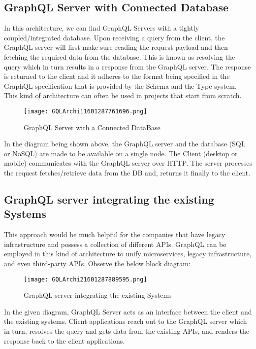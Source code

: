 \documentclass[../main.tex]{subfiles}
\begin{document}
\subsection{GraphQL Server with Connected Database}
In this architecture, we can find GraphQL Servers with a tightly coupled/integrated database.
Upon receiving a query from the client, the GraphQL server will first make sure reading the request payload and then fetching the required data from the database.
This is known as resolving the query which in turn results in a response from the GraphQL server.
The response is returned to the client and it adheres to the format being specified in the GraphQL specification that is provided by the Schema and the Type system.
This kind of architecture can often be used in projects that start from scratch.

\begin{figure}[h!]
\centerline{\texttt{[image: GQLArchi11601287761696.png]}}
\caption{GraphQL Server with a Connected DataBase}
\label{fig:GraphQL-Server-with-a-Connected-DataBase}
\end{figure}

In the diagram being shown above, the GraphQL server and the database (SQL or NoSQL) are made to be available on a single node. The Client (desktop or mobile) communicates with the GraphQL server over HTTP. The server processes the request fetches/retrieve data from the DB and, returns it finally to the client.

\subsection{GraphQL server integrating the existing Systems}
This approach would be much helpful for the companies that have legacy infrastructure and possess a collection of different APIs. GraphQL can be employed in this kind of architecture to unify microservices, legacy infrastructure, and even third-party APIs.
Observe the below block diagram:

\begin{figure}[h!]
\centerline{\texttt{[image: GQLArchi21601287889595.png]}}
\caption{GraphQL server integrating the existing Systems}
\label{fig:GraphQL-server-integrating-the-existing-Systems}
\end{figure}

In the given diagram, GraphQL Server acts as an interface between the client and the existing systems. Client applications reach out to the GraphQL server which in turn, resolves the query and gets data from the existing APIs, and renders the response back to the client applications.





\printglossaries
\end{document}

